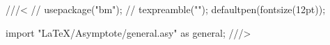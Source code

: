 \usepackage{asymptote}

\makeatletter
\newcommand{\asycode}[2][]{%
    \stepcounter{asy}%
    \setkeys{ASYkeys}{#1}%
    \ifASYattach
    \ASYinlinefalse
    \fi
    \ifx\asydir\empty\else
    \def\ASYprefix{\asydir/}%
    \fi
    \immediate\write\AsyPreStream{%
        \noexpand\InputIfFileExists{%
            \ASYprefix\noexpand\jobname-\the\c@asy.pre}{}{}%
    }
    \asy@write@graphic@header
    \immediate\write\AsyStream{\detokenize{#2}}%
    \asy@finalise@stream
    \asy@input@graphic
}
\makeatother
\newcommand{\asyinput}[1]{ \asycode{include #1;} }
\newcommand{\asyinputx}[1]{  }

\begin{asydef}
///<
// usepackage("bm");
// texpreamble("\def\V#1{\bm{#1}}");
defaultpen(fontsize(12pt));

import "LaTeX/Asymptote/general.asy" as general;
///>
\end{asydef}
